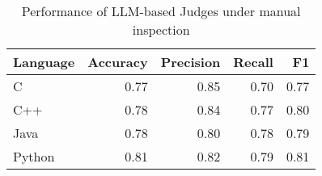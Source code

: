 \begin{table}[!t]
  \centering
  \caption{Performance of LLM-based Judges under manual inspection}
    \begin{tabular}{lrrrr}
    \toprule
     Language & Accuracy & Precision & Recall & F1 \\
    \midrule
    C     &   0.77  & 0.85 & 0.70  & 0.77 \\
    C++   &  0.78   &  0.84  & 0.77    & 0.80 \\
    Java  &  0.78 &  0.80  & 0.78 & 0.79 \\
    Python &  0.81  &  0.82 & 0.79      & 0.81 \\
    \bottomrule
    \end{tabular}%
  \label{tab:dis_judge}%
\end{table}%